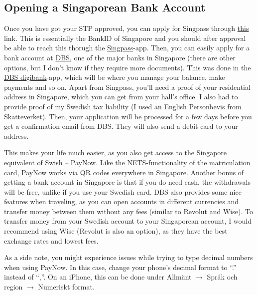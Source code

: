 \subsection*{Opening a Singaporean Bank Account}
{}
Once you have got your STP approved, you can apply for Singpass through \href{https://portal.singpass.gov.sg/home/ui/register/instructions}{this} link. This is essentially the BankID of Singapore and you should after approval be able to reach this thorugh the \href{https://www.google.com/url?sa=t&source=web&rct=j&opi=89978449&url=https://apps.apple.com/sg/app/singpass/id1340660807&ved=2ahUKEwj8ouKcoaWLAxVyUGcHHd3CKWgQFnoECBUQAQ&usg=AOvVaw2MU54ywzShBUAGdsGy2E40}{Singpass}-app. Then, you can easily apply for a bank account at \href{https://www.dbs.com.sg/index/default.page}{DBS}, one of the major banks in Singapore (there are other options, but I don't know if they require more documents). This was done in the \href{https://www.google.com/url?sa=t&source=web&rct=j&opi=89978449&url=https://apps.apple.com/sg/app/dbs-digibank/id1068403826&ved=2ahUKEwjWjsikoqWLAxW2UGwGHWeHHRsQFnoECBcQAQ&usg=AOvVaw3MmyWfIWdIEfDqXsxZtKcG}{DBS digibank}-app, which will be where you manage your balance, make payments and so on. Apart from Singpass, you'll need a proof of your residential address in Singapore, which you can get from your hall's office. I also had to provide proof of my Swedish tax liability (I used an English Personbevis from Skatteverket). Then, your application will be processed for a few days before you get a confirmation email from DBS. They will also send a debit card to your address. 

This makes your life much easier, as you also get access to the Singapore equivalent of Swish -- PayNow. Like the NETS-functionality of the matriculation card, PayNow works via QR codes everywhere in Singapore. Another bonus of getting a bank account in Singapore is that if you do need cash, the withdrawals will be free, unlike if you use your Swedish card. DBS also provides some nice features when traveling, as you can open accounts in different currencies and transfer money between them without any fees (similar to Revolut and Wise). To transfer money from your Swedish account to your Singaporean account, I would recommend using Wise (Revolut is also an option), as they have the best exchange rates and lowest fees.

As a side note, you might experience issues while trying to type decimal numbers when using PayNow. In this case, change your phone's decimal format to ``.'' instead of ``,''. On an iPhone, this can be done under Allmänt $\rightarrow$ Språk och region $\rightarrow$ Numeriskt format.

